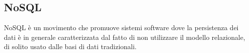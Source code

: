 
\subsection*{NoSQL}
NoSQL è un movimento che promuove sistemi software dove la persistenza dei dati è in generale caratterizzata dal fatto di non utilizzare il modello relazionale, di solito usato dalle basi di dati tradizionali.

